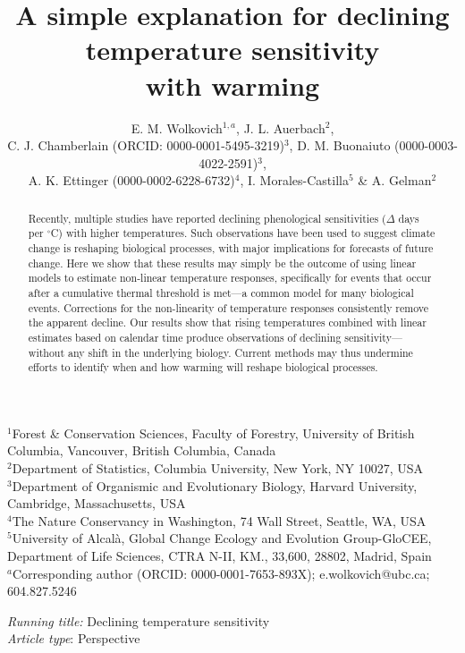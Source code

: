\documentclass[11pt,letter]{article}
\begin{document}
\title{A simple explanation for declining temperature sensitivity \\ with warming} %
\author{E. M. Wolkovich$^{1,a}$,  J. L. Auerbach$^{2}$, \\C. J. Chamberlain (ORCID: 0000-0001-5495-3219)$^{3}$, D. M. Buonaiuto (0000-0003-4022-2591)$^{3}$, \\ A. K. Ettinger (0000-0002-6228-6732)$^4$, I. Morales-Castilla$^{5}$ \& A. Gelman$^{2}$} 
\date{} %
\maketitle
$^1$Forest \& Conservation Sciences, Faculty of Forestry, University of British Columbia, Vancouver, British Columbia, Canada\\
$^2$Department of Statistics, Columbia University, New York, NY 10027, USA\\
$^3$Department of Organismic and Evolutionary Biology, Harvard University, Cambridge, Massachusetts, USA\\
$^4$The Nature Conservancy in Washington, 74 Wall Street, Seattle, WA, USA\\
$^5$University of Alcal\`a, Global Change Ecology and Evolution Group-GloCEE, Department of Life Sciences, CTRA N-II, KM., 33,600, 28802, Madrid, Spain\\
$^a$Corresponding author (ORCID: 0000-0001-7653-893X); e.wolkovich@ubc.ca; 604.827.5246
\vspace{3ex}

\emph{Running title:} Declining temperature sensitivity\\
\emph{Article type}: Perspective\\

\newpage
\begin{abstract} %
Recently, multiple studies have reported declining phenological sensitivities ($\Delta$ days per $^{\circ}$C) with higher temperatures. Such observations have been used to suggest climate change is reshaping biological processes, with major implications for forecasts of future change. Here we show that these results may simply be the outcome of using linear models to estimate non-linear temperature responses, specifically for events that occur after a cumulative thermal threshold is met---a common model for many biological events. Corrections for the non-linearity of temperature responses consistently remove the apparent decline. Our results show that rising temperatures combined with linear estimates based on calendar time produce observations of declining sensitivity---without any shift in the underlying biology. Current methods may thus undermine efforts to identify when and how warming will reshape biological processes.
\end{abstract}
\vspace{5ex}
\end{document}
